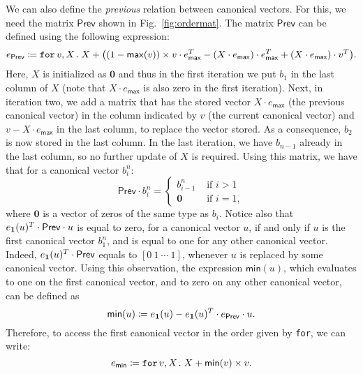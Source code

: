 We can also define the \textit{previous} relation between canonical vectors. For this, we need
the matrix $\mathsf{Prev}$ shown in Fig.~\ref{fig:ordermat}.
The matrix 
$\mathsf{Prev}$ can be defined using the following \langfor expression:
$$e_{\mathsf{Prev}}\coloneqq  \texttt{for}\, v,X \texttt{.}\, X + \bigl((1 - \mathsf{max}(v))\times v\cdot e_{\mathsf{max}}^T - (X\cdot e_{\mathsf{max}})\cdot e_{\mathsf{max}}^T + (X\cdot e_{\mathsf{max}})\cdot v^T\bigr).$$
Here, $X$ is initialized as $\mathbf{0}$ and thus in the first iteration we put
 $b_1$ in the last column of $X$ (note that $X\cdot e_{\mathsf{max}}$ is also zero in the first iteration). Next, in iteration two, we add a matrix that has the stored vector $X\cdot e_{\mathsf{max}}$ (the previous canonical vector) in the column indicated by $v$ (the current canonical vector) and $v-X\cdot e_{\mathsf{max}}$ in the last column, to replace the vector stored. As a consequence, $b_2$ is now stored in the last column. In the last iteration, we have $b_{n-1}$ already in the last column, so no further update of $X$ is required.
Using this matrix, we have that for a canonical vector $b_i^n$:
\[
\mathsf{Prev}\cdot b_i^n=\begin{cases}
               b_{i-1}^n & \text{ if } i > 1 \\
              \mathbf{0} & \text{ if } i = 1,
            \end{cases}
\]
where $\mathbf{0}$ is a vector of zeros of the same type as $b_i$. Notice also that $e_{\mathbf{1}}(u)^T\cdot \mathsf{Prev} \cdot u$ is equal to zero, for a canonical vector $u$, if and only if $u$ is the first canonical vector $b_1^n$, and is equal to one for any other canonical vector. Indeed, $e_{\mathbf{1}}(u)^T\cdot \mathsf{Prev}$ equals to $[0\ 1\ \cdots\ 1]$, whenever $u$ is replaced by some canonical vector. Using this observation, the expression $\mathsf{min}(u)$, which evaluates to one on the first canonical vector, and to zero on any other canonical vector, can be  defined as $$\mathsf{min}(u) \coloneqq  e_{\mathbf{1}}(u) - e_{\mathbf{1}}(u)^T\cdot e_{\mathsf{Prev}} \cdot u.$$
Therefore, to access the first canonical vector in the order given by \texttt{for}, we can write:
$$e_{\mathsf{min}} \coloneqq  \texttt{for}\, v,X \texttt{.}\, X + \mathsf{min}(v)\times v.$$


